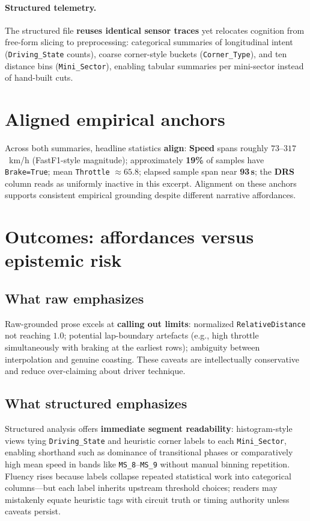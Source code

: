 \documentclass[11pt,a4paper]{article}
\begin{document}
\paragraph{Structured telemetry.}
The structured file \textbf{reuses identical sensor traces} yet relocates cognition from free-form slicing to preprocessing: categorical summaries of longitudinal intent (\texttt{Driving\_State} counts), coarse corner-style buckets (\texttt{Corner\_Type}), and ten distance bins (\texttt{Mini\_Sector}), enabling tabular summaries per mini-sector instead of hand-built cuts.

\section{Aligned empirical anchors}

Across both summaries, headline statistics \textbf{align}: \textbf{Speed} spans roughly $73$--$317$~km/h (FastF1-style magnitude); approximately \textbf{19\%} of samples have \texttt{Brake=True}; mean \texttt{Throttle} $\approx 65.8$; elapsed sample span near \textbf{93\,s}; the \textbf{DRS} column reads as uniformly inactive in this excerpt. Alignment on these anchors supports consistent empirical grounding despite different narrative affordances.

\section{Outcomes: affordances versus epistemic risk}

\subsection{What raw emphasizes}

Raw-grounded prose excels at \textbf{calling out limits}: normalized \texttt{RelativeDistance} not reaching $1.0$; potential lap-boundary artefacts (e.g., high throttle simultaneously with braking at the earliest rows); ambiguity between interpolation and genuine coasting. These caveats are intellectually conservative and reduce over-claiming about driver technique.

\subsection{What structured emphasizes}

Structured analysis offers \textbf{immediate segment readability}: histogram-style views tying \texttt{Driving\_State} and heuristic corner labels to each \texttt{Mini\_Sector}, enabling shorthand such as dominance of transitional phases or comparatively high mean speed in bands like \texttt{MS\_8}--\texttt{MS\_9} without manual binning repetition. Fluency rises because labels collapse repeated statistical work into categorical columns---but each label inherits upstream threshold choices; readers may mistakenly equate heuristic tags with circuit truth or timing authority unless caveats persist.
\end{document}
